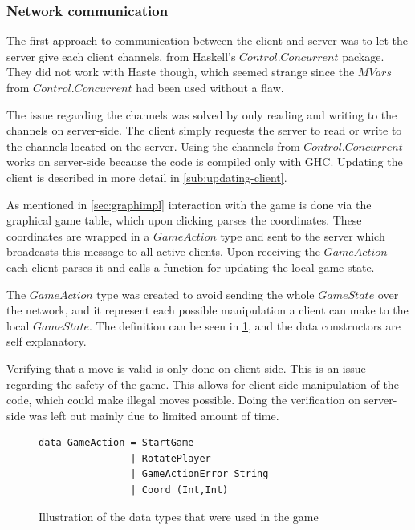 \documentclass[a4paper]{article}
\begin{document}

\subsubsection{Network communication}
The first approach to communication between the client and server was to let the server give each client channels, from Haskell's $Control.Concurrent$ package. They did not work with Haste though, which seemed strange since the $MVars$ from $Control.Concurrent$ had been used without a flaw.

The issue regarding the channels was solved by only reading and writing to the channels on server-side. The client simply requests the server to read or write to the channels located on the server. Using the channels from $Control.Concurrent$ works on server-side because the code is compiled only with GHC. Updating the client is described in more detail in \cref{sub:updating-client}.

As mentioned in \cref{sec:graphimpl} interaction with the game is done via the graphical game table, which upon clicking parses the coordinates. These coordinates are wrapped in a $GameAction$ type and sent to the server which broadcasts this message to all active clients. Upon receiving the $GameAction$ each client parses it and calls a function for updating the local game state.

The $GameAction$ type was created to avoid sending the whole $GameState$ over the network, and it represent each possible manipulation a client can make to the local $GameState$. The definition can be seen in \cref{fig:gameAction}, and the data constructors are self explanatory.

Verifying that a move is valid is only done on client-side. This is an issue regarding the safety of the game. This allows for client-side manipulation of the code, which could make illegal moves possible. Doing the verification on server-side was left out mainly due to limited amount of time. 


\begin{figure}[H]
\begin{lstlisting}
data GameAction = StartGame 
                | RotatePlayer 
                | GameActionError String 
                | Coord (Int,Int)
\end{lstlisting}
    \caption{Illustration of the data types that were used in the game}
    \label{fig:gameAction}
\end{figure}
\end{document}
